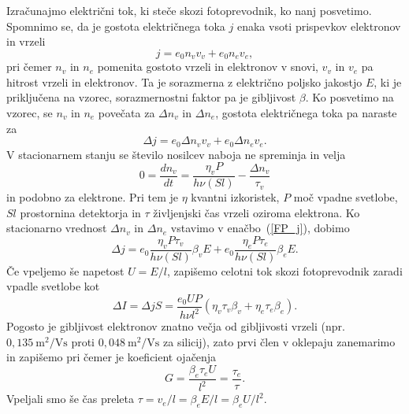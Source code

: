 Izračunajmo električni tok, ki steče skozi fotoprevodnik, ko nanj posvetimo. 
Spomnimo se, da je gostota električnega toka $j$ enaka vsoti prispevkov elektronov 
 in vrzeli
\begin{equation}
j = e_0 n_v v_v + e_0 n_e v_e,
\end{equation}
pri čemer $n_v$ in $n_e$ pomenita gostoto vrzeli in elektronov v snovi, $v_v$ in $v_e$ pa 
hitrost vrzeli in elektronov. Ta je sorazmerna z električno poljsko jakostjo $E$, ki je priključena
 na vzorec, sorazmernostni faktor pa je  gibljivost $\beta$. Ko posvetimo na vzorec, 
 se $n_v$ in $n_e$ povečata za $\Delta n_v$ in $\Delta n_e$,
gostota električnega toka pa naraste za
\begin{equation}
\Delta j = e_0 \Delta n_v v_v + e_0 \Delta n_e v_e.
\label{FP_j}
\end{equation}
V stacionarnem stanju se število nosilcev naboja ne spreminja in velja
\begin{equation}
0 = \frac{dn_v}{dt} = \frac{\eta_v P}{h \nu (Sl)} - \frac{\Delta n_v}{\tau_v}
\end{equation}
in podobno za elektrone. Pri tem je $\eta$ kvantni izkoristek, 
$P$ moč vpadne svetlobe,
$Sl$ prostornina detektorja in $\tau$ življenjski čas vrzeli oziroma elektrona. 
Ko stacionarno vrednost $\Delta n_v$ in $\Delta n_e$ vstavimo v enačbo~(\ref{FP_j}), dobimo
\begin{equation}
\Delta j = e_0 \frac{\eta_v P \tau_v}{h \nu (Sl)} \beta_v  E + 
e_0 \frac{\eta_e P \tau_e}{h \nu (Sl)} \beta_e  E.
\end{equation}
Če vpeljemo še napetost $U = E/l$, zapišemo celotni tok skozi fotoprevodnik zaradi 
vpadle svetlobe kot
\begin{equation}
\Delta I = \Delta j S = \frac{e_0 U P }{h \nu l^2} \left(\eta_v \tau_v \beta_v + 
\eta_e \tau_e \beta_e \right).
\end{equation}
Pogosto je gibljivost elektronov znatno večja od gibljivosti vrzeli (npr.
$0,135~\si{\meter}^2/\si{\volt\second}$ proti $0,048~\si{\meter}^2/\si{\volt\second}$ za silicij), 
 zato prvi člen v oklepaju zanemarimo in zapišemo
pri čemer je koeficient ojačenja 
\begin{equation}
G = \frac{\beta_e \tau_e U}{l^2} = \frac{\tau_e}{\tau}.
\end{equation}
Vpeljali smo še čas preleta $\tau = v_e/l = \beta_e E/l = \beta_e U/l^2$.

